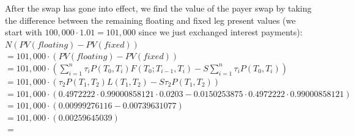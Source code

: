 \documentclass{article}
\begin{document}
{After the swap has gone into effect, we find the value of the payer swap by taking the difference between the remaining floating and fixed leg present values (we start with $100,000 \cdot 1.01 = 101,000$ since we just exchanged interest payments): \\
$N(PV(floating) - PV(fixed))$ \\
$= 101,000 \cdot (PV(floating) - PV(fixed))$ \\
$= 101,000 \cdot (\sum_{i=1}^{n} \tau_i P(T_0, T_i) F(T_0; T_{i-1}, T_i) - S \sum_{i=1}^{n} \tau_i P(T_0, T_i))$ \\ 
$= 101,000 \cdot (\tau_2 P(T_1, T_2) L(T_1, T_2) - S \tau_2 P(T_1, T_2))$ \\
$= 101,000 \cdot (0.4972222 \cdot 0.99000858121 \cdot 0.0203 - 0.0150253875 \cdot 0.4972222 \cdot 0.99000858121)$ \\
$= 101,000 \cdot (0.00999276116 - 0.00739631077)$ \\
$= 101,000 \cdot (0.00259645039)$ \\
$= $ 

}
\end{document}
